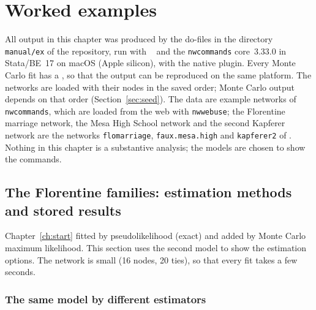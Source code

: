 \chapter{Worked examples}\label{ch:examples}

All output in this chapter was produced by the do-files in the directory \texttt{manual/ex} of the repository, run with \nwergm{}~\pkgversion{} and the \texttt{nwcommands} core~3.33.0 in Stata/BE~17 on macOS (Apple silicon), with the native plugin. Every Monte Carlo fit has a , so that the output can be reproduced on the same platform. The networks are loaded with their nodes in the saved order; Monte Carlo output depends on that order (Section~\ref{sec:seed}). The data are example networks of \texttt{nwcommands}, which are loaded from the web with \texttt{nwwebuse}; the Florentine marriage network, the Mesa High School network and the second Kapferer network are the networks \texttt{flomarriage}, \texttt{faux.mesa.high} and \texttt{kapferer2} of \ergm{}. Nothing in this chapter is a substantive analysis; the models are chosen to show the commands.

\section{The Florentine families: estimation methods and stored results}\label{sec:florentine}

Chapter~\ref{ch:start} fitted  by pseudolikelihood (exact) and added  by Monte Carlo maximum likelihood. This section uses the second model to show the estimation options. The network is small (16 nodes, 20 ties), so that every fit takes a few seconds.

\subsection{The same model by different estimators}\label{sec:flo_methods}

